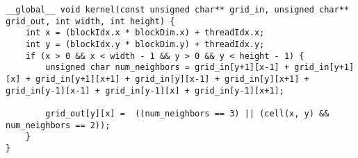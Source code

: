 \begin{lstlisting}
__global__ void kernel(const unsigned char** grid_in, unsigned char** grid_out, int width, int height) {
	int x = (blockIdx.x * blockDim.x) + threadIdx.x;
	int y = (blockIdx.y * blockDim.y) + threadIdx.y;
	if (x > 0 && x < width - 1 && y > 0 && y < height - 1) {
		unsigned char num_neighbors = grid_in[y+1][x-1] + grid_in[y+1][x] + grid_in[y+1][x+1] + grid_in[y][x-1] + grid_in[y][x+1] + grid_in[y-1][x-1] + grid_in[y-1][x] + grid_in[y-1][x+1];

		grid_out[y][x] =  ((num_neighbors == 3) || (cell(x, y) && num_neighbors == 2));
	}
}
\end{lstlisting}
